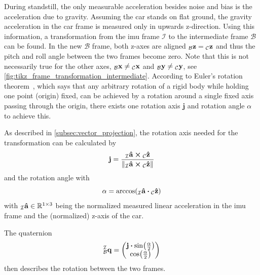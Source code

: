 During standstill, the only measurable acceleration besides noise and bias is the acceleration due to gravity.
Assuming the car stands on flat ground, the gravity acceleration in the car frame is measured only in upwards z-direction.
Using this information, a transformation from the \gls{imu} frame $\mathcal{I}$ to the intermediate frame $\mathcal{B}$ can be found.
In the new $\mathcal{B}$ frame, both z-axes are aligned $\vincs{z}{b} = \vincs{z}{c}$ and thus the pitch and roll angle between the two frames become zero.
Note that this is not necessarily true for the other axes, $\vincs{x}{b}\neq\vincs{x}{c}$ and $\vincs{y}{b}\neq\vincs{y}{c}$, see \cref{fig:tikz_frame_transformation_intermediate}.
According to Euler's rotation theorem~\cite{Euler1776}, which says that any arbitrary rotation of a rigid body while holding one point (origin) fixed, can be achieved by a rotation around a single fixed axis passing through the origin, there exists one rotation axis $\mathbf{j}$ and rotation angle $\alpha$ to achieve this.

As described in \cref{subsec:vector_projection}, the rotation axis needed for the transformation can be calculated by
\begin{equation}
    \vb{j} = \frac{\vincs{\vu{a}}{i} \cp \vincs{\vu{z}}{c}}{\norm{\vincs{\vu{a}}{i} \cp \vincs{\vu{z}}{c}}}
\end{equation}
and the rotation angle with
\begin{equation}
    \alpha = \arccos(\vincs{\vu{a}}{i}\vdot \vincs{\vu{z}}{c})
\end{equation}
with $\vincs{\vu{a}}{i} \in \mathbb{R}^{1\times3}$ being the normalized measured linear acceleration in the \gls{imu} frame and  the (normalized) z-axis of the car.

The quaternion
\begin{equation}
    \qtf{i}{b} =
    \begin{pmatrix}
        \vb{j}\vdot\sin(\frac{\alpha}{2}) \\
        \cos(\frac{\alpha}{2})
    \end{pmatrix}
\end{equation}
then describes the rotation between the two frames.

